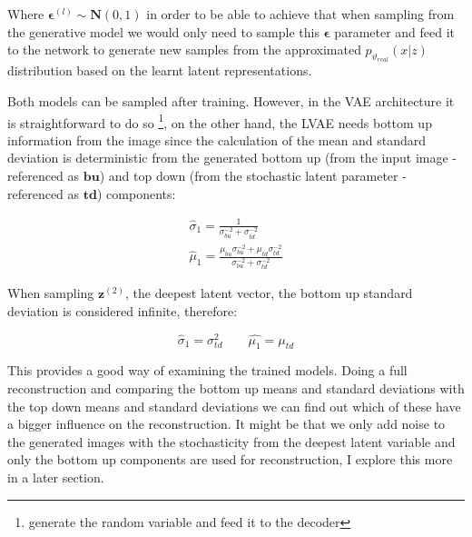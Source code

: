 \documentclass[12pt, english]{article}
\begin{document}
\par Where $\boldsymbol{\bm{\epsilon}}^{(l)} \sim \boldsymbol{N}(0, 1)$ in order to be able to achieve that when sampling from the generative model we would only need to sample this $\bm{\epsilon}$ parameter and feed it to the network to generate new samples from the approximated $p_{\vartheta_{real}}(x | z)$ distribution based on the learnt latent representations.

\vspace{4mm}

\par Both models can be sampled after training. However, in the VAE architecture it is straightforward to do so \footnote{generate the random variable and feed it to the decoder}, on the other hand, the LVAE needs bottom up information from the image since the calculation of the mean and standard deviation is deterministic from the generated bottom up (from the input image - referenced as $\bm{bu}$) and top down (from the stochastic latent parameter - referenced as $\bm{td}$) components:

\vspace{4mm}

\begin{gather}
    \label{eq:z1-mean-sigma-1}
    \hat{\sigma}_{1} = \frac{1}{\sigma_{bu}^{-2} + \sigma_{td}^{-2}} \\
    \hat{\mu}_{1} = \frac{\mu_{bu}\sigma_{bu}^{-2} + \mu_{td}\sigma_{td}^{-2}}{\sigma_{bu}^{-2} + \sigma_{td}^{-2}}
    \label{eq:z1-mean-sigma-2}
\end{gather}

\vspace{4mm}

\par When sampling $\bm{z}^{(2)}$, the deepest latent vector, the bottom up standard deviation is considered infinite, therefore:

\vspace{4mm}

\begin{equation}
    \hat{\sigma}_{1} = \sigma_{td}^{2} \quad \quad \hat{\mu_{1}} = \mu_{td}
    \label{eq:ladder-vae-sampling}
\end{equation}

\vspace{4mm}

\par This provides a good way of examining the trained models. Doing a full reconstruction and comparing the bottom up means and standard deviations with the top down means and standard deviations we can find out which of these have a bigger influence on the reconstruction. It might be that we only add noise to the generated images with the stochasticity from the deepest latent variable and only the bottom up components are used for reconstruction, I explore this more in a later section.
\end{document}
